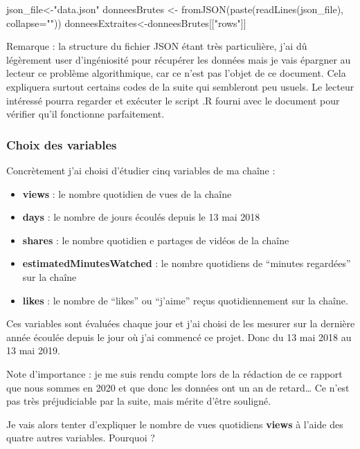 \begin{Schunk}
\begin{Sinput}
json_file<-"data.json"
donneesBrutes <- fromJSON(paste(readLines(json_file), collapse=""))
donneesExtraites<-donneesBrutes[["rows"]]
\end{Sinput}
\end{Schunk}

Remarque : la structure du fichier JSON étant très particulière, j'ai dû
légèrement user d'ingéniosité pour récupérer les données mais je vais
épargner au lecteur ce problème algorithmique, car ce n'est pas l'objet
de ce document. Cela expliquera surtout certains codes de la suite qui
sembleront peu usuels. Le lecteur intéressé pourra regarder et exécuter
le script .R fourni avec le document pour vérifier qu'il fonctionne
parfaitement.

\hypertarget{choix-des-variables}{%
\subsubsection{Choix des variables}\label{choix-des-variables}}

Concrètement j'ai choisi d'étudier cinq variables de ma chaîne :

\begin{itemize}
\tightlist
\item
  \textbf{views} : le nombre quotidien de vues de la chaîne
\item
  \textbf{days} : le nombre de jours écoulés depuis le 13 mai 2018
\item
  \textbf{shares} : le nombre quotidien e partages de vidéos de la
  chaîne
\item
  \textbf{estimatedMinutesWatched} : le nombre quotidiens de ``minutes
  regardées'' sur la chaîne
\item
  \textbf{likes} : le nombre de ``likes'' ou ``j'aime'' reçus
  quotidiennement sur la chaîne.
\end{itemize}

Ces variables sont évaluées chaque jour et j'ai choisi de les mesurer
sur la dernière année écoulée depuis le jour où j'ai commencé ce projet.
Donc du 13 mai 2018 au 13 mai 2019.

Note d'importance : je me suis rendu compte lors de la rédaction de ce
rapport que nous sommes en 2020 et que donc les données ont un an de
retard\ldots{} Ce n'est pas très préjudiciable par la suite, mais mérite
d'être souligné.

Je vais alors tenter d'expliquer le nombre de vues quotidiens
\textbf{views} à l'aide des quatre autres variables. Pourquoi ?

